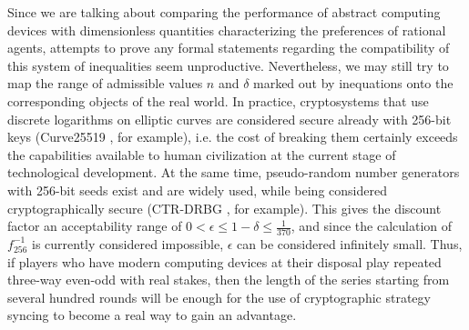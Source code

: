 Since we are talking about comparing the performance of abstract computing devices with dimensionless quantities characterizing the preferences of rational agents, attempts to prove any formal statements regarding the compatibility of this system of inequalities seem unproductive. Nevertheless, we may still try to map the range of admissible values $n$ and $\delta$ marked out by inequations onto the corresponding objects of the real world. In practice, cryptosystems that use discrete logarithms on elliptic curves are considered secure already with 256-bit keys (Curve25519 \cite{Bernstein}, for example), i.e. the cost of breaking them certainly exceeds the capabilities available to human civilization at the current stage of technological development. At the same time, pseudo-random number generators with 256-bit seeds exist and are widely used, while being considered cryptographically secure (CTR-DRBG \cite{Hoang}, for example). This gives the discount factor an acceptability range of $0 < \epsilon \le 1 - \delta \le \frac{1}{370}$, and since the calculation of $f_{256}^{-1}$ is currently considered impossible, $\epsilon$ can be considered infinitely small. Thus, if players who have modern computing devices at their disposal play repeated three-way even-odd with real stakes, then the length of the series starting from several hundred rounds will be enough for the use of cryptographic strategy syncing to become a real way to gain an advantage. %

